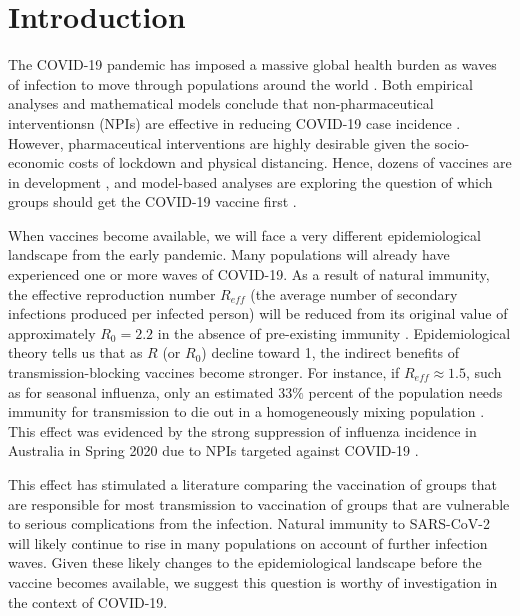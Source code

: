 \begin{abstract}

\end{abstract}


\section{Introduction}


The COVID-19 pandemic has imposed a massive global health burden as waves of infection to move through populations around the world \cite{miller2020disease}.  Both empirical analyses and mathematical models conclude that non-pharmaceutical interventionsn (NPIs) are effective in reducing COVID-19 case incidence \cite{anderson2020estimating,peak2020individual,tuite2020mathematical}.  However, pharmaceutical interventions are highly desirable given the socio-economic costs of lockdown and physical distancing.  Hence, dozens of vaccines are  in development \cite{lurie2020developing}, and  model-based analyses are exploring the question of which groups should get the COVID-19 vaccine first \cite{bubar2020model,hoyt2020vaccine}.  


When vaccines become available, we will face a very different epidemiological landscape from the early pandemic. Many populations will already have experienced one or more waves of COVID-19.  As a result of natural immunity, the effective reproduction number $R_{eff}$ (the average number of secondary infections produced per infected person) will be reduced from its original value of approximately $R_0 = 2.2$ in the absence of pre-existing immunity \cite{hilton2020estimation}. Epidemiological theory tells us that as $R$ (or $R_0$) decline toward 1, the indirect benefits of transmission-blocking vaccines become stronger.  For instance, if $R_{eff} \approx 1.5$, such as for seasonal influenza, only an estimated $33 \%$ percent of the population needs immunity for transmission to die out in a homogeneously mixing population  \cite{anderson1992infectious,dushoff2007vaccinating}.  This effect was evidenced by the strong suppression of influenza incidence in Australia in Spring 2020 due to NPIs targeted against COVID-19 \cite{aussie2020}. 

This effect has stimulated a literature comparing the vaccination of groups that are responsible for most transmission to vaccination of groups that are vulnerable to serious complications from the infection. Natural immunity to SARS-CoV-2 will likely continue to rise in many populations on account of further infection waves. Given these likely changes to the epidemiological landscape before the vaccine becomes available, we suggest this question is worthy of investigation in the context of COVID-19. 


